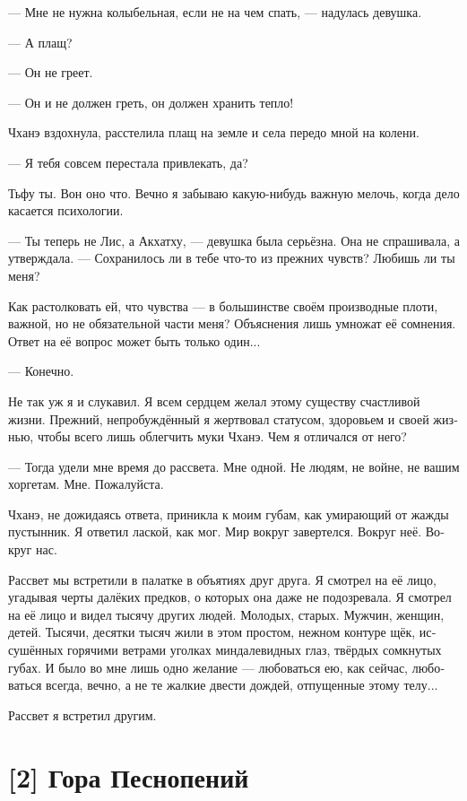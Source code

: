 \documentclass[a4paper,12pt,fleqn]{book}\usepackage{cooltooltips}\usepackage{polyglossia}\setdefaultlanguage[babelshorthands=true]{russian}\setotherlanguage{english}\defaultfontfeatures{Ligatures=TeX,Mapping=tex-text} \usepackage{xcolor}\definecolor{lightgray}{HTML}{bbbbbb}\color{lightgray}\newcommand{\ml}[3]{\textenglish{\textcolor{black}{#3}}}
\begin{document}
{--- Мне не нужна колыбельная, если не на чем спать, --- надулась девушка.

--- А плащ?

--- Он не греет.

--- Он и не должен греть, он должен хранить тепло!

Чханэ вздохнула, расстелила плащ на земле и села передо мной на колени.

--- Я тебя совсем перестала привлекать, да?

Тьфу ты.
Вон оно что.
Вечно я забываю какую-нибудь важную мелочь, когда дело касается психологии.

--- Ты теперь не Лис, а Акхатху, --- девушка была серьёзна.
Она не спрашивала, а утверждала.
--- Сохранилось ли в тебе что-то из прежних чувств?
Любишь ли ты меня?

Как растолковать ей, что чувства --- в большинстве своём производные плоти, важной, но не обязательной части меня?
Объяснения лишь умножат её сомнения.
Ответ на её вопрос может быть только один...

--- Конечно.

Не так уж я и слукавил.
Я всем сердцем желал этому существу счастливой жизни.
Прежний, непробуждённый я жертвовал статусом, здоровьем и своей жизнью, чтобы всего лишь облегчить муки Чханэ.
Чем я отличался от него?

--- Тогда удели мне время до рассвета.
Мне одной.
Не людям, не войне, не вашим хоргетам.
Мне.
Пожалуйста.

Чханэ, не дожидаясь ответа, приникла к моим губам, как умирающий от жажды пустынник.
Я ответил лаской, как мог.
Мир вокруг завертелся.
Вокруг неё.
Вокруг нас.

Рассвет мы встретили в палатке в объятиях друг друга.
Я смотрел на её лицо, угадывая черты далёких предков, о которых она даже не подозревала.
Я смотрел на её лицо и видел тысячу других людей.
Молодых, старых.
Мужчин, женщин, детей.
Тысячи, десятки тысяч жили в этом простом, нежном контуре щёк, иссушённых горячими ветрами уголках миндалевидных глаз, твёрдых сомкнутых губах.
И было во мне лишь одно желание --- любоваться ею, как сейчас, любоваться всегда, вечно, а не те жалкие двести дождей, отпущенные этому телу...

Рассвет я встретил другим.

\section{[2] Гора Песнопений}

}
\end{document}
